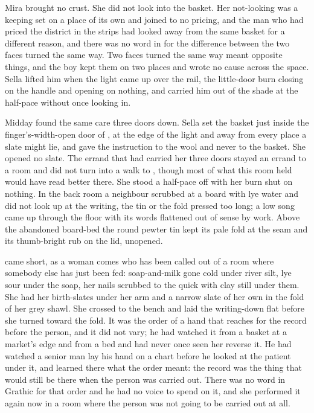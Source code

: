 Mira brought no crust. She did not look into the basket. Her not-looking was a keeping set on a place of its own and joined to no pricing, and the man who had priced the district in the strips had looked away from the same basket for a different reason, and there was no word in  for the difference between the two faces turned the same way. Two faces turned the same way meant opposite things, and the boy kept them on two places and wrote no cause across the space. Sella lifted him when the light came up over the rail, the little-door burn closing on the handle and opening on nothing, and carried him out of the shade at the half-pace without once looking in.

\scenebreak

Midday found the same care three doors down. Sella set the basket just inside the finger's-width-open door of , at the edge of the light and away from every place a slate might lie, and gave the instruction to the wool and never to the basket. She opened no slate. The errand that had carried her three doors stayed an errand to a room and did not turn into a walk to , though most of what this room held would have read better there. She stood a half-pace off with her burn shut on nothing. In the back room a neighbour scrubbed at a board with lye water and did not look up at the writing, the tin or the fold pressed too long; a low song came up through the floor with its words flattened out of sense by work. Above the abandoned board-bed the round pewter tin kept its pale fold at the seam and its thumb-bright rub on the lid, unopened.

 came short, as a woman comes who has been called out of a room where somebody else has just been fed: soap-and-milk gone cold under river silt, lye sour under the soap, her nails scrubbed to the quick with clay still under them. She had her birth-slates under her arm and a narrow slate of her own in the fold of her grey shawl. She crossed to the bench and laid the writing-down flat before she turned toward the fold. It was the order of a hand that reaches for the record before the person, and it did not vary; he had watched it from a basket at a market's edge and from a bed and had never once seen her reverse it. He had watched a senior man lay his hand on a chart before he looked at the patient under it, and learned there what the order meant: the record was the thing that would still be there when the person was carried out. There was no word in Grathic for that order and he had no voice to spend on it, and she performed it again now in a room where the person was not going to be carried out at all.

